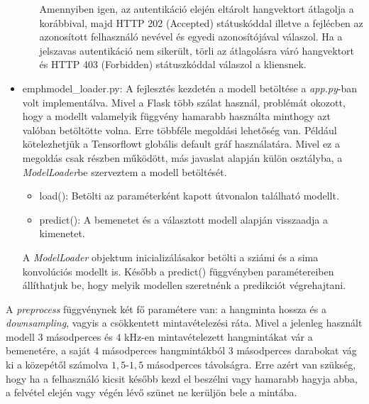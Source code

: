 \begin{itemize}
\begin{itemize}
		\newline
		\newline
		Amennyiben igen, az autentikáció elején eltárolt hangvektort átlagolja a korábbival, majd HTTP 202 (Accepted) státuskóddal illetve a fejlécben az azonosított felhasználó nevével és egyedi azonosítójával válaszol.
		\newline
		\newline
		Ha a jelszavas autentikáció nem sikerült, törli az átlagolásra váró hangvektort és HTTP 403 (Forbidden) státuszkóddal válaszol a kliensnek.
	\end{itemize}

	\item emph{model\_loader.py}:
		A fejlesztés kezdetén a modell betöltése a \emph{app.py}-ban volt implementálva. Mivel a Flask több szálat használ, problémát okozott, hogy a modellt valamelyik függvény hamarabb használta minthogy azt valóban betöltötte volna.
		\newline
		\newline
		Erre többféle megoldási lehetőség van. Például kötelezhetjük a Tensorflowt globális default gráf használatára. Mivel ez a megoldás csak részben működött, más javaslat alapján külön osztályba, a \emph{ModelLoader}be szerveztem a modell betöltését.
		\newline	

	\begin{itemize}
		\item load(): Betölti az paraméterként kapott útvonalon található modellt.
		\item predict(): A bemenetet és a választott modell alapján visszaadja a kimenetet.  
	\end{itemize}

		A \emph{ModelLoader} objektum inicializálásakor betölti a sziámi és a sima konvolúciós modellt is. Később a predict() függvényben paramétereiben állíthatjuk be, hogy melyik modellen szeretnénk a predikciót végrehajtani.
\end{itemize}

A \emph{preprocess} függvénynek két fő paramétere van: a hangminta hossza és a \emph{downsampling}, vagyis a csökkentett mintavételezési ráta. Mivel a jelenleg használt modell $3$ másodperces és $4$ kHz-en mintavételezett hangmintákat vár a bemenetére, a saját $4$ másodperces hangmintákból $3$ másodperces darabokat vág ki a közepétől számolva $1,5$-$1,5$ másodperces távolságra. Erre azért van szükség, hogy ha a felhasználó kicsit később kezd el beszélni vagy hamarabb hagyja abba, a felvétel elején vagy végén lévő szünet ne kerüljön bele a mintába.
\newline

